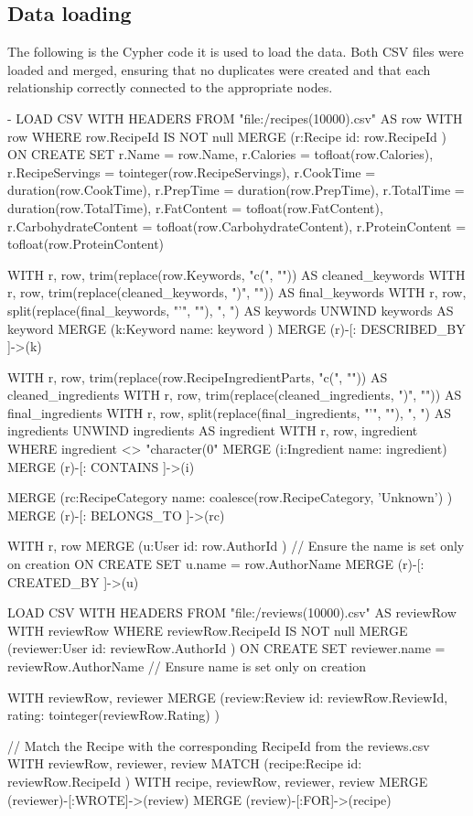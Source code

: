 \subsection{Data loading}
The following is the Cypher code it is used to load the data. Both CSV files were loaded and merged, ensuring that no duplicates were created and that each relationship correctly connected to the appropriate nodes.
\begin{CypherQuery}
-
LOAD CSV WITH HEADERS FROM "file:/recipes(10000).csv" AS row
WITH row
WHERE row.RecipeId IS NOT null
MERGE (r:Recipe { id: row.RecipeId })
ON CREATE SET r.Name = row.Name, r.Calories = tofloat(row.Calories), r.RecipeServings = tointeger(row.RecipeServings), r.CookTime = duration(row.CookTime), r.PrepTime = duration(row.PrepTime), r.TotalTime = duration(row.TotalTime), r.FatContent = tofloat(row.FatContent), r.CarbohydrateContent = tofloat(row.CarbohydrateContent), r.ProteinContent = tofloat(row.ProteinContent)

WITH r, row, trim(replace(row.Keywords, "c(", "")) AS cleaned_keywords
WITH r, row, trim(replace(cleaned_keywords, ")", "")) AS final_keywords
WITH r, row, split(replace(final_keywords, "'", ""), ", ") AS keywords
UNWIND keywords AS keyword
MERGE (k:Keyword { name: keyword })
MERGE (r)-[: DESCRIBED_BY ]->(k)

WITH r, row, trim(replace(row.RecipeIngredientParts, "c(", "")) AS cleaned_ingredients
WITH r, row, trim(replace(cleaned_ingredients, ")", "")) AS final_ingredients
WITH r, row, split(replace(final_ingredients, "'", ""), ", ") AS ingredients
UNWIND ingredients AS ingredient
WITH r, row, ingredient
WHERE ingredient <> "character(0"
MERGE (i:Ingredient {name: ingredient})
MERGE (r)-[: CONTAINS ]->(i)

MERGE (rc:RecipeCategory { name: coalesce(row.RecipeCategory, 'Unknown') })
MERGE (r)-[: BELONGS_TO ]->(rc)

WITH r, row
MERGE (u:User { id: row.AuthorId })
// Ensure the name is set only on creation
ON CREATE SET u.name = row.AuthorName 
MERGE (r)-[: CREATED_BY ]->(u)

LOAD CSV WITH HEADERS FROM "file:/reviews(10000).csv" AS reviewRow
WITH reviewRow
WHERE reviewRow.RecipeId IS NOT null
MERGE (reviewer:User { id: reviewRow.AuthorId })
ON CREATE SET reviewer.name = reviewRow.AuthorName 
// Ensure name is set only on creation

WITH reviewRow, reviewer
MERGE (review:Review { id: reviewRow.ReviewId, rating: tointeger(reviewRow.Rating) })

// Match the Recipe with the corresponding RecipeId from the reviews.csv
WITH reviewRow, reviewer, review
MATCH (recipe:Recipe { id: reviewRow.RecipeId })
WITH recipe, reviewRow, reviewer, review
MERGE (reviewer)-[:WROTE]->(review)
MERGE (review)-[:FOR]->(recipe)
\end{CypherQuery}
